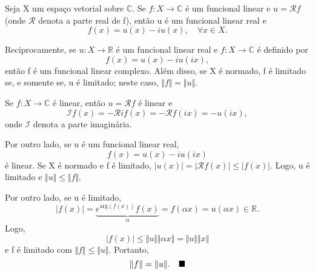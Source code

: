 \documentclass[../functional_analysis.tex]{subfiles}
\begin{document}
  \begin{prop*}
    Seja X um espaço vetorial sobre \(\mathbb{C}.\) Se \(f:X\rightarrow \mathbb{C}\) é um funcional linear e \(u= \mathcal{R}f\) (onde \(\mathcal{R}\) denota a parte real de f), então u é um funcional linear real e 
      \[
        f(x)=u(x)-iu(x),\quad \forall x\in X.
      \]

      Reciprocamente, se \(u:X\rightarrow \mathbb{R}\) é um funcional linear real e \(f:X\rightarrow \mathbb{C}\) é definido por 
        \[
          f(x)=u(x)-iu(ix),
        \]
        então f é um funcional linear complexo. Além disso, se X é normado, f é limitado se, e somente se, u é limitado; neste caso, \(\Vert f \Vert = \Vert u \Vert.\)
  \end{prop*}
 \begin{proof*}
   Se \(f:X\rightarrow \mathbb{C}\) é linear, então \(u=\mathcal{R}f\) é linear e 
     \[
       \mathcal{I}f(x)=-\mathcal{R}if(x)=-\mathcal{R}f(ix)=-u(ix),
     \]
     onde \(\mathcal{I}\) denota a parte imaginária.

     Por outro lado, se u é um funcional linear real, 
       \[
         f(x)=u(x)-iu(ix)
       \]
       é linear. Se X é normado e f é limitado, \(|u(x)|=|\mathcal{R}f(x)|\leq |f(x)|.\) Logo, u é limitado e \(\Vert u \Vert\leq \Vert f \Vert.\)

       Por outro lado, se u é limitado, 
         \[
           |f(x)|=\underbrace{e^{\mathrm{arg}(f(x))}f(x)}_{\alpha }=f(\alpha x)=u(\alpha x)\in \mathbb{R}.
         \]
         Logo, 
           \[
             |f(x)|\leq \Vert u \Vert \Vert \alpha x \Vert = \Vert u \Vert \Vert x \Vert
           \]
           e f é limitado com \(\Vert f \Vert\leq \Vert u \Vert.\) Portanto, 
             \[
               \Vert f \Vert=\Vert u \Vert.\quad \text{$\blacksquare$}
             \]
 \end{proof*}
\end{document}
